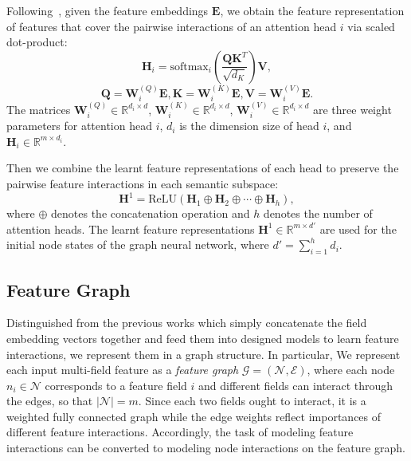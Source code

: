 \documentclass[sigconf]{acmart}
\begin{document}
Following~\cite{song2018autoint}, given the feature embeddings $\mathbf{E}$, we obtain the feature representation of features that cover the pairwise interactions of an attention head $i$ via scaled dot-product:
\begin{equation}\nonumber
\mathbf{H}_{i} = \text{softmax}_{i}(\frac{\mathbf{Q}\mathbf{K}^{T}}{\sqrt{d_{K}}})\mathbf{V},
\end{equation}
\begin{equation}\nonumber
\mathbf{Q}=\mathbf{W}_i^{(Q)}\mathbf{E}, \mathbf{K}=\mathbf{W}_i^{(K)}\mathbf{E}, \mathbf{V}=\mathbf{W}_i^{(V)}\mathbf{E}. 
\end{equation}
The matrices $\mathbf{W}_i^{(Q)} \in \mathbb{R}^{d_i \times d}$, $\mathbf{W}_i^{(K)} \in \mathbb{R}^{d_i \times d}$, $\mathbf{W}_i^{(V)} \in \mathbb{R}^{d_i \times d}$ are three weight parameters for attention head $i$, $d_i$ is the dimension size of head $i$, and $\mathbf{H}_{i} \in \mathbb{R}^{m \times d_i}$.

Then we combine the learnt feature representations of each head to preserve the pairwise feature interactions in each semantic subspace:
\begin{equation}\nonumber
\mathbf{H}^1 = \text{ReLU}(\mathbf{H}_{1}\oplus \mathbf{H}_{2}\oplus \cdots \oplus \mathbf{H}_{h}),
\end{equation}
where $\oplus$ denotes the concatenation operation and $h$ denotes the number of attention heads.
The learnt feature representations $\mathbf{H}^1 \in \mathbb{R}^{m \times d'}$ are used for the initial node states of the graph neural network, where $d' = \sum_{i=1}^h d_i$.

\subsection{Feature Graph} 
Distinguished from the previous works which simply concatenate the field embedding vectors together and feed them into designed models to learn feature interactions, we represent them in a graph structure.
In particular, We represent each input multi-field feature as a \emph{feature graph} $\mathcal{G} = (\mathcal{N}, \mathcal{E})$,
where each node $n_{i} \in \mathcal{N}$ corresponds to a feature field $i$ and different fields can interact through the edges, so that $\left | \mathcal{N} \right | = m$. 
Since each two fields ought to interact, it is a weighted fully connected graph while the edge weights reflect importances of different feature interactions. 
Accordingly, the task of modeling feature interactions can be converted to modeling node interactions on the feature graph. 
\end{document}
